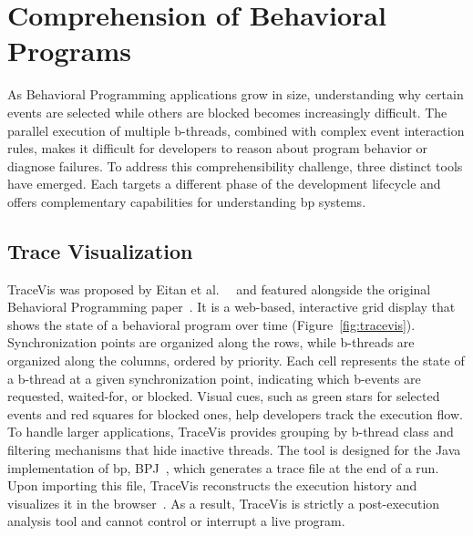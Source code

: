 \section{Comprehension of Behavioral Programs}
\label{sec:sota_bp_comprehension}
 
As Behavioral Programming applications grow in size, understanding why certain events are selected while others are blocked becomes increasingly difficult.
The parallel execution of multiple b-threads, combined with complex event interaction rules, makes it difficult for developers to reason about program behavior or diagnose failures.
To address this comprehensibility challenge, three distinct tools have emerged.
Each targets a different phase of the development lifecycle and offers complementary capabilities for understanding \gls{bp} systems.

\subsection{Trace Visualization}
\label{subsec:tracevis}
 
TraceVis was proposed by Eitan et al.\ ~\cite{eitan_visualization_2011} and featured alongside the original Behavioral Programming paper~\cite{harel_behavioral_2012}.
It is a web-based, interactive grid display that shows the state of a behavioral program over time (Figure~\ref{fig:tracevis}).
Synchronization points are organized along the rows, while b-threads are organized along the columns, ordered by priority.
Each cell represents the state of a b-thread at a given synchronization point, indicating which b-events are requested, waited-for, or blocked.
Visual cues, such as green stars for selected events and red squares for blocked ones, help developers track the execution flow.
To handle larger applications, TraceVis provides grouping by b-thread class and filtering mechanisms that hide inactive threads.
The tool is designed for the Java implementation of \gls{bp}, BPJ~\cite{harel_programming_2010}, which generates a trace file at the end of a run.
Upon importing this file, TraceVis reconstructs the execution history and visualizes it in the browser~\cite{eitan_visualization_2011}.
As a result, TraceVis is strictly a post-execution analysis tool and cannot control or interrupt a live program.


